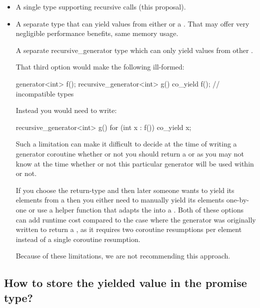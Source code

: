 \documentclass{wg21}
\begin{document}
\begin{itemize}
\item A single  type supporting recursive calls (this proposal).

\item A separate type  that can yield values from either  or a . That may offer very negligible performance benefits, same memory usage.

\tcode A separate {recursive_generator} type which can only yield values from other . 

That third option would make the following ill-formed:

\begin{colorblock}
generator<int> f();
recursive_generator<int> g() {
    co_yield f(); // incompatible types
}
\end{colorblock}

Instead you would need to write:
\begin{colorblock}
recursive_generator<int> g() {
  for (int x : f()) co_yield x;
}
\end{colorblock}

Such a limitation can make it difficult to decide at the time of writing a generator
coroutine whether or not you should return a  or 
as you may not know at the time whether or not this particular generator will be used
within  or not.

If you choose the  return-type and then later someone wants to yield its
elements from a  then you either need to manually yield its
elements one-by-one or use a helper function that adapts the  into a
. Both of these options can add runtime cost compared to the
case where the generator was originally written to return a ,
as it requires two coroutine resumptions per element instead of a single coroutine resumption.

Because of these limitations, we are not recommending this approach.
\end{itemize}

\subsection{How to store the yielded value in the promise type?}
\end{document}
